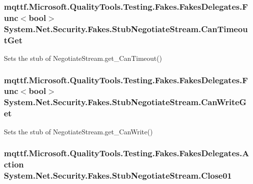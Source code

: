 \hypertarget{class_system_1_1_net_1_1_security_1_1_fakes_1_1_stub_negotiate_stream_abb4afbe631a24fdbf14d161efab2a4a9}{
\subsubsection[{Can\-Timeout\-Get}]{\setlength{\rightskip}{0pt plus 5cm}mqttf.\-Microsoft.\-Quality\-Tools.\-Testing.\-Fakes.\-Fakes\-Delegates.\-Func$<$bool$>$ System.\-Net.\-Security.\-Fakes.\-Stub\-Negotiate\-Stream.\-Can\-Timeout\-Get}}\label{class_system_1_1_net_1_1_security_1_1_fakes_1_1_stub_negotiate_stream_abb4afbe631a24fdbf14d161efab2a4a9}


Sets the stub of Negotiate\-Stream.\-get\-\_\-\-Can\-Timeout()

\hypertarget{class_system_1_1_net_1_1_security_1_1_fakes_1_1_stub_negotiate_stream_ae9991b8c7a9ee8bbdae8dacba9f4882c}{
\subsubsection[{Can\-Write\-Get}]{\setlength{\rightskip}{0pt plus 5cm}mqttf.\-Microsoft.\-Quality\-Tools.\-Testing.\-Fakes.\-Fakes\-Delegates.\-Func$<$bool$>$ System.\-Net.\-Security.\-Fakes.\-Stub\-Negotiate\-Stream.\-Can\-Write\-Get}}\label{class_system_1_1_net_1_1_security_1_1_fakes_1_1_stub_negotiate_stream_ae9991b8c7a9ee8bbdae8dacba9f4882c}


Sets the stub of Negotiate\-Stream.\-get\-\_\-\-Can\-Write()

\hypertarget{class_system_1_1_net_1_1_security_1_1_fakes_1_1_stub_negotiate_stream_a674e846a4fe168b20497d6c799c6b016}{
\subsubsection[{Close01}]{\setlength{\rightskip}{0pt plus 5cm}mqttf.\-Microsoft.\-Quality\-Tools.\-Testing.\-Fakes.\-Fakes\-Delegates.\-Action System.\-Net.\-Security.\-Fakes.\-Stub\-Negotiate\-Stream.\-Close01}}\label{class_system_1_1_net_1_1_security_1_1_fakes_1_1_stub_negotiate_stream_a674e846a4fe168b20497d6c799c6b016}


